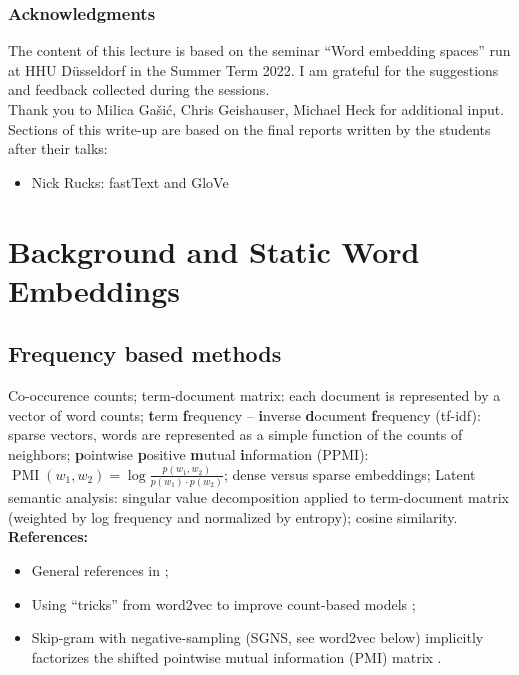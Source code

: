 \documentclass[11pt, a4paper]{amsart}
\begin{document}
\subsubsection{Acknowledgments}

The content of this lecture is based on the seminar ``Word embedding spaces'' run at HHU Düsseldorf in the Summer Term 2022.
I am grateful for the suggestions and feedback collected during the sessions. \\
Thank you to Milica Gašić, Chris Geishauser, Michael Heck for additional input. \\
Sections of this write-up are based on the final reports written by the students after their talks:
\begin{itemize}
	\item Nick Rucks: fastText and GloVe
\end{itemize}

\section{Background and Static Word Embeddings}
\label{sec:static_word_embeddings}


\subsection{Frequency based methods}

Co-occurence counts;
term-document matrix: each document is represented by a vector of word counts;
\textbf{t}erm \textbf{f}requency -- \textbf{i}nverse \textbf{d}ocument \textbf{f}requency (tf-idf):
sparse vectors, words are represented as a simple function of the counts of neighbors;
\textbf{p}ointwise \textbf{p}ositive \textbf{m}utual \textbf{i}nformation (PPMI):
$\operatorname{PMI}(w_{1}, w_{2}) = \log \frac{p(w_{1}, w_{2})}{p(w_{1}) \cdot p(w_{2})}$;
dense versus sparse embeddings;
Latent semantic analysis:
singular value decomposition applied to term-document matrix (weighted by log frequency and normalized by entropy);
cosine similarity.
\newline
\textbf{References:}
\begin{itemize}
    \item General references in ;
    \item Using ``tricks'' from word2vec to improve count-based models \cite{levy-etal-2015-improving};
    \item Skip-gram with negative-sampling (SGNS, see word2vec below) implicitly factorizes the shifted pointwise mutual information (PMI) matrix \cite{NIPS2014_feab05aa}.
\end{itemize}
\end{document}
